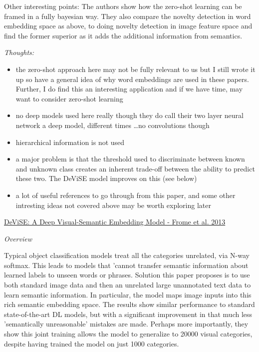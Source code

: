 \documentclass[12pt]{report}
\begin{document}
Other interesting points: The authors show how the zero-shot learning can be framed in a fully bayesian way. They also compare the novelty detection in word embedding space as above, to doing novelty detection in image feature space and find the former superior as it adds the additional information from semantics.

\textit{Thoughts:}
\begin{itemize}
    \item the zero-shot approach here may not be fully relevant to us but I still wrote it up so have a general idea of why word embeddings are used in these papers. Further, I do find this an interesting application and if we have time, may want to consider zero-shot learning
    \item no deep models used here really though they do call their two layer neural network a deep model, different times \dots no convolutions though
    \item hierarchical information is not used
    \item a major problem is that the threshold used to discriminate between known and unknown class creates an inherent trade-off between the ability to predict these two. The DeViSE model improves on this (see below)
    \item a lot of useful references to go through from this paper, and some other intresting ideas not covered above may be worth exploring later \\
\end{itemize}

\underline{DeViSE: A Deep Visual-Semantic Embedding Model - Frome et al. 2013}

\textit{Overview}

Typical object classification models treat all the categories unrelated, via N-way softmax. This leads to models that 'cannot transfer semantic information about learned labels to unseen words or phrases. Solution this paper proposes is to use both standard image data and then an unrelated large unannotated text data to learn semantic information. In particular, the model maps image inputs into this rich semantic embedding space. The results show similar performance to standard state-of-the-art DL models, but with a significant improvement in that much less 'semantically unreasonable' mistakes are made. Perhaps more importantly, they show this joint training allows the model to generalize to 20000 visual categories, despite having trained the model on just 1000 categories.
\end{document}
